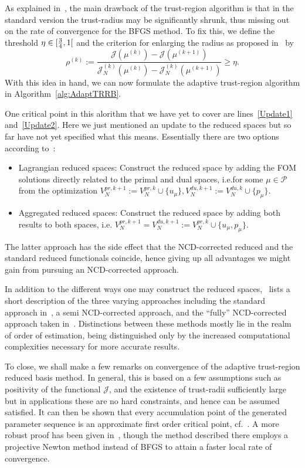 As explained in~\cite{Keil2021}, the main drawback of the trust-region algorithm is that in the standard version the trust-radius may be significantly shrunk, thus missing out on the rate of convergence for the BFGS method.
To fix this, we define the threshold $\eta \in \interval[open right]{\frac{3}{4}}{1}$ and the criterion for enlarging the radius as proposed in~\cite[Inequality 4.7]{Keil2021} by
\begin{equation*}\label{EnlargingCriterion}
    \rho^{(k)} := \frac{\mathcal{J}(\mu^{(k)}) - \mathcal{J}(\mu^{(k + 1)})}{\mathcal{J}_N^{(k)}(\mu^{(k)}) - \mathcal{J}_N^{(k)}(\mu^{(k + 1)})} \geq \eta.
\end{equation*}
With this idea in hand, we can now formulate the adaptive trust-region algorithm in Algorithm~\ref{alg:AdaptTRRB}.

One critical point in this alorithm that we have yet to cover are lines~\ref{Update1} and~\ref{Update2}.
Here we just mentioned an update to the reduced spaces but so far have not yet specified what this means.
Essentially there are two options according to~\cite{Keil2021}:
\begin{itemize}
    \item Lagrangian reduced spaces: Construct the reduced space by adding the FOM solutions directly related to the primal and dual spaces, i.e.\@ for some $\mu \in \mathcal{P}$ from the optimization $V_N^{pr, k + 1} := V_N^{pr, k} \cup \{ u_\mu \}, V_N^{du, k + 1} := V_N^{du, k} \cup \{ p_\mu \}$.
    \item Aggregated reduced spaces: Construct the reduced space by adding both results to both spaces, i.e. $V_N^{pr, k + 1} = V_N^{du, k + 1} := V_N^{pr, k} \cup \{ u_\mu, p_\mu \}$.
\end{itemize}
The latter approach has the side effect that the NCD-corrected reduced and the standard reduced functionals coincide, hence giving up all advantages we might gain from pursuing an NCD-corrected approach.

In addition to the different ways one may construct the reduced spaces,~\cite[Subsection 4.4]{Keil2021} lists a short description of the three varying approaches including the standard approach in~\cite{Qian2017}, a semi NCD-corrected approach, and the ``fully'' NCD-corrected approach taken in~\cite{Keil2021}.
Distinctions between these methods mostly lie in the realm of order of estimation, being distinguished only by the increased computational complexities necessary for more accurate results.

To close, we shall make a few remarks on convergence of the adaptive trust-region reduced basis method.
In general, this is based on a few assumptions such as positivity of the functional $\mathcal{J}$, and the existence of trust-radii sufficiently large but in applications these are no hard constraints, and hence can be assumed satisfied.
It can then be shown that every accumulation point of the generated parameter sequence is an approximate first order critical point, cf.~\cite[Theorem 4.5]{Keil2021}.
A more robust proof has been given in~\cite{Banholzer2020}, though the method described there employs a projective Newton method instead of BFGS to attain a faster local rate of convergence.

